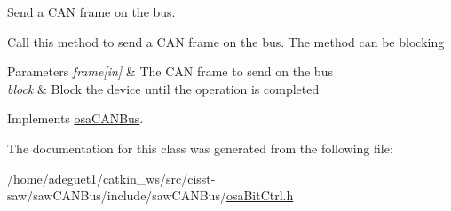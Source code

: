 Send a C\-A\-N frame on the bus. 

Call this method to send a C\-A\-N frame on the bus. The method can be blocking 
\begin{DoxyParams}{Parameters}
{\em frame\mbox{[}in\mbox{]}} & The C\-A\-N frame to send on the bus \\
\hline
{\em block} & Block the device until the operation is completed \\
\hline
\end{DoxyParams}


Implements \hyperlink{classosa_c_a_n_bus_a21b88fd2a857089845305d1e2eabb5b9}{osa\-C\-A\-N\-Bus}.



The documentation for this class was generated from the following file\-:\begin{DoxyCompactItemize}
\item 
/home/adeguet1/catkin\-\_\-ws/src/cisst-\/saw/saw\-C\-A\-N\-Bus/include/saw\-C\-A\-N\-Bus/\hyperlink{osa_bit_ctrl_8h}{osa\-Bit\-Ctrl.\-h}\end{DoxyCompactItemize}
